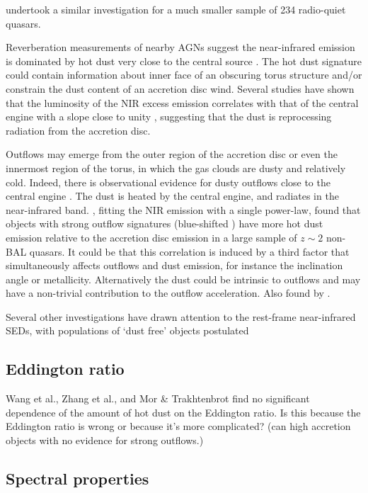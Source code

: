 \citet{gallagher07} undertook a similar investigation for a much smaller sample of 234 radio-quiet quasars.

Reverberation measurements of nearby AGNs suggest the near-infrared emission is dominated by hot dust very close to the central source \citep[few tens of light days; e.g.][]{minezaki04,suganuma06}. 
The hot dust signature could contain information about inner face of an obscuring torus structure and/or constrain the dust content of an accretion disc wind. 
Several studies have shown that the luminosity of the NIR excess emission correlates with that of the central engine with a slope close to unity \cite[e.g.][]{gallagher07}, suggesting that the dust is reprocessing radiation from the accretion disc. 

Outflows may emerge from the outer region of the accretion disc or even the innermost region of the torus, in which the gas clouds are dusty and relatively cold.  
Indeed, there is observational evidence for dusty outflows close to the central engine \citep[e.g.][]{bowler14}.
The dust is heated by the central engine, and radiates in the near-infrared band. 
\citet{wang13}, fitting the NIR emission with a single power-law, found that objects with strong outflow signatures (blue-shifted ) have more hot dust emission relative to the accretion disc emission in a large sample of $z\sim2$ non-BAL quasars. 
It could be that this correlation is induced by a third factor that simultaneously affects outflows and dust emission, for instance the inclination angle or metallicity. 
Alternatively the dust could be intrinsic to outflows and may have a non-trivial contribution to the outflow acceleration.
Also found by \citet{shen14}. 

Several other investigations have drawn attention to the rest-frame near-infrared SEDs, with populations of `dust free' objects postulated \citep{hao10,hao11,jiang10,mor11} 


\subsection{Eddington ratio}

Wang et al., Zhang et al., and Mor \& Trakhtenbrot find no significant dependence of the amount of hot dust on the Eddington ratio. 
Is this because the Eddington ratio is wrong or because it's more complicated? (can high accretion objects with no evidence for strong outflows.)

\subsection{Spectral properties}

